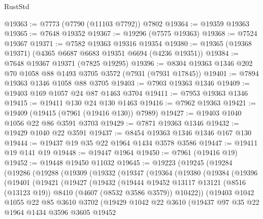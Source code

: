 \begin{lexlean}{RustStd}
\begin{coremodule}
@19363 := @7773 (@7790 (@11103 @7792)) @7802
@19364 := @19359 @19363
@19365 := @7648 @19352
@19367 := @19296 (@7575 @19363)
@19368 := @7524 @19367
@19371 := @7582 @19363 @19316 @19354
@19380 := @19365 (@19368 @19371) (@4365 @6687 @6683 @19351 @6694 (@4236 @19351))
@19384 := @7648 @19367 @19371 (@7825 @19295)
@19396 := @8304 @19363 @1346 @202 @70 @1058 @88 @1493 @3705 @3572 (@7931 (@7931 @17845))
@19401 := @7894 @19363 @1346 @1058 @88 @3705
@19403 := @7903 @19363 @1346
@19409 := @19403 @169 @1057 @24 @87 @1463 @3704
@19411 := @7953 @19363 @1346
@19415 := @19411 @130 @24 @130 @1463
@19416 := @7962 @19363
@19421 := @19409 (@19415 (@7961 (@19416 @130)) @7989)
@19427 := @19403 @1040 @1056 @22 @86 @3591 @3703
@19429 := @7871 @19363 @1346
@19432 := @19429 @1040 @22 @3591
@19437 := @8454 @19363 @1346 @1346 @167 @130
@19444 := @19437 @19 @35 @22 @1964 @1434 @3578 @3586
@19447 := @19411 @19 @141 @19
@19448 := @19447 @1964
@19450 := @7961 (@19416 @19)
@19452 := @19448 @19450 @11032
@19645 := @19223
    (@19245
      (@19284
        (@19286
          (@19288
            (@19309
              (@19332
                (@19347
                  (@19364
                    (@19380
                      (@19384
                        (@19396
                          (@19401
                            (@19421
                              (@19427
                                (@19432
                                  (@19444
                                    @19452
                                    @13117
                                    @13121
                                    (@8516 (@13123 @19))
                                    @8410
                                    (@4607 (@8532 @3586 @3579))
                                    @10422))
                                (@19403
                                  @1042
                                  @1055
                                  @22
                                  @85
                                  @3610
                                  @3702
                                  (@19429
                                    @1042
                                    @22
                                    @3610
                                    (@19437
                                      @97
                                      @35
                                      @22
                                      @1964
                                      @1434
                                      @3596
                                      @3605
                                      @19452

\end{coremodule}
\end{lexlean}
